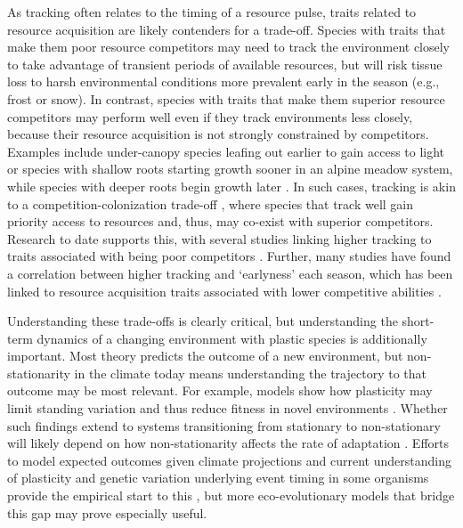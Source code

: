 \documentclass[11pt,letterpaper]{article}
\newcommand{\R}[1]{\label{#1}\linelabel{#1}}
\begin{document}
\R{traittradeoffstart}As tracking often relates to the timing of a resource pulse, traits related to resource acquisition are likely contenders for a trade-off. Species with traits that make them poor resource competitors may need to track the environment closely to take advantage of transient periods of available resources, but will risk tissue loss to harsh environmental conditions more prevalent early in the season (e.g., frost or snow). In contrast, species with traits that make them superior resource competitors may perform well even if they track environments less closely, because their resource acquisition is not strongly constrained by competitors. Examples include under-canopy species leafing out earlier to gain access to light \citep{heberling2019} or species with shallow roots starting growth sooner in an alpine meadow system, while species with deeper roots begin growth later \citep{Zhu2016BioLetters}. In such cases, tracking is akin to a competition-colonization trade-off \citep{Amarasekare:2003tq}, where species that track well gain priority access to resources and, thus, may co-exist with superior competitors. Research to date supports this, with several studies linking higher tracking to traits associated with being poor competitors \citep{Dorji2013,lasky2016,Zhu2016BioLetters}. Further, many studies have found a correlation between higher tracking and `earlyness' each season, which has been linked to resource acquisition traits associated with lower competitive abilities \citep[][see Box `Trait trade-offs with tracking']{wolkovich2014aob}. \R{traittradeoffend} 

Understanding these trade-offs is clearly critical, but understanding the short-term dynamics of a changing environment with plastic species is additionally important. Most theory predicts the outcome of a new environment, but non-stationarity in the climate today means understanding the trajectory to that outcome may be most relevant. For example, models show how plasticity may limit standing variation and thus reduce fitness in novel environments \citep{Ghalambor2007,fox2019}. Whether such findings extend to systems transitioning from stationary to non-stationary will likely depend on how non-stationarity affects the rate of adaptation \citep{chevin2010}. Efforts to model expected outcomes given climate projections and current understanding of plasticity and genetic variation underlying event timing in some organisms provide the empirical start to this \citep[e.g.,][]{fournier2016}, but more eco-evolutionary models that bridge this gap may prove especially useful. \R{endplastic}
\end{document}
